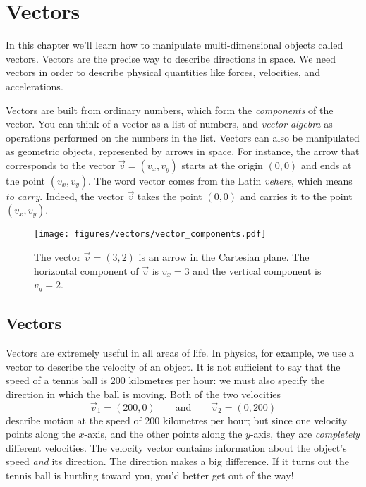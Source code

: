 
%
%

\chapter{Vectors}
\label{chapter:vectors}

In this chapter we'll learn how to manipulate multi-dimensional objects called vectors.						
Vectors are the precise way to describe directions in space.
We need vectors in order to describe physical quantities like forces, velocities, and accelerations.

Vectors are built from ordinary numbers,
which form the \emph{components} of the vector.
You can think of a vector as a list of numbers,
and \emph{vector algebra} as operations
performed on the numbers in the list.
Vectors can also be manipulated as geometric objects,
represented by arrows in space.
For instance, the arrow that corresponds to the vector $\vec{v}=(v_x,v_y)$ starts at the origin $(0,0)$
and ends at the point $(v_x,v_y)$.
The word vector comes from the Latin \emph{vehere},
which means \emph{to carry}.
Indeed, the vector $\vec{v}$ takes the point $(0,0)$ and carries it to the point $(v_x,v_y)$.

\begin{figure}[H]
	\centering
	\texttt{[image: figures/vectors/vector\_components.pdf]}
	\vspace{-2mm}
	\caption{	The vector $\vec{v}=(3,2)$ is an arrow in the Cartesian plane.
			The horizontal component of $\vec{v}$ is $v_x=3$
			and the vertical component  is $v_y=2$.}
	\label{fig:vector_components}
\end{figure}





\section{Vectors}
\label{sec:vectors}

	Vectors are extremely useful in all areas of life.
	In physics, for example, we use a vector to describe the velocity of an object.
	It is not sufficient to say that the speed of a tennis ball is 200 kilometres per hour:
	we must also specify the direction in which the ball is moving.
	Both of the two velocities 
	\[
	 \vec{v}_1 = (200,0) 
	 \qquad \textrm{and}
	 \qquad \vec{v}_2=(0,200)
	\]
	describe motion at the speed of $200$ kilometres per hour;
	but since one velocity points along the $x$-axis, and the other points along the $y$-axis,
	they are \emph{completely} different velocities. 
	The velocity vector contains information about the object's speed \emph{and} its direction.
	The direction makes a big difference.
	If it turns out the tennis ball is hurtling toward you, you'd better get out of the way!

